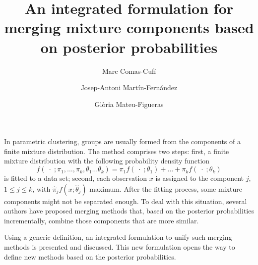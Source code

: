 \documentclass[a4paper,11pt]{article}
\title{An integrated formulation for merging mixture components based on posterior probabilities}
\author{Marc Comas-Cufí \and Josep-Antoni Martín-Fernández \and Glòria Mateu-Figueras}
\begin{document}
\maketitle

In parametric clustering, groups are usually formed from the components of a finite mixture distribution. The method comprises two steps: first, a finite mixture distribution with  the following probability density function
\[
f(\;\cdot\; ; \pi_1, \dots, \pi_k, \theta_1 \dots \theta_k) = \pi_1  f (\;\cdot\; ; \theta_1) + \dots + \pi_k f(\;\cdot\; ; \theta_k)
\]
is fitted to a data set; second, each observation $x$ is assigned to the component $j$, $1\leq j \leq k$, with $\hat{\pi}_j f( x ; \hat{\theta}_j)$ maximum. After the fitting process, some mixture components might not be separated enough. To deal with this situation, several authors have proposed merging methods that, based on the posterior probabilities incrementally, combine those components that are more similar. 

Using a generic definition, an integrated formulation to unify such merging methods is presented and discussed. This new formulation opens the way to define new methods based on the posterior probabilities.

%
%
%
%
%
%
\end{document}
